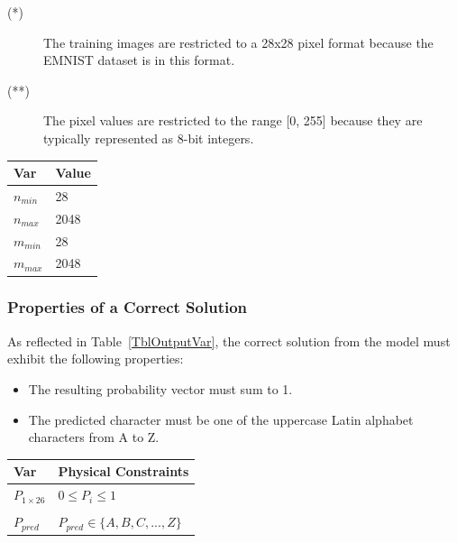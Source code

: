 \documentclass[12pt]{article}
\begin{document}
\noindent 
\begin{description}
\item[(*)] The training images are restricted to a 28x28 pixel format because
the EMNIST dataset is in this format.
\item[(**)] The pixel values are restricted to the range [0, 255] because they
are typically represented as 8-bit integers.
\end{description}

\begin{table}[!h]
\caption{Specification Parameter Values} \label{TblSpecParams}
\renewcommand{\arraystretch}{1.2}
\noindent \begin{longtable*}{l l} 
  \toprule
  \textbf{Var} & \textbf{Value} \\
  \midrule 
  $n_{min}$ & 28 \\
  $n_{max}$ & 2048 \\
  $m_{min}$ & 28 \\
  $m_{max}$ & 2048 \\
  \bottomrule
\end{longtable*}
\end{table}

\subsubsection{Properties of a Correct Solution} \label{sec_CorrectSolution}

\noindent
As reflected in Table~\ref{TblOutputVar}, the correct solution from the model
must exhibit the following properties:

\begin{itemize}
  \item The resulting probability vector must sum to 1.
  \item The predicted character must be one of the uppercase Latin alphabet
  characters from A to Z. 
\end{itemize}


\begin{table}[!h]
\caption{Output Variables} \label{TblOutputVar}
\renewcommand{\arraystretch}{1.2}
\noindent \begin{longtable*}{l l} 
  \toprule
  \textbf{Var} & \textbf{Physical Constraints} \\
  \midrule 
  $P_{1 \times 26}$ & $0 \leq P_i \leq 1$ \\
  \\
  $P_{pred}$ & $P_{pred} \in \{A, B, C, ..., Z\}$ \\
  \bottomrule
\end{longtable*}
\end{table}
\end{document}
